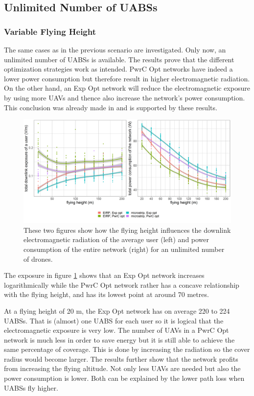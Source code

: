 \documentclass[twocolumn]{phdsymp} %
\begin{document}
\subsection{Unlimited Number of UABSs}
\subsubsection{Variable Flying Height}
The same cases as in the previous scenario are investigated. Only now, an unlimited number of \gls{UABS}s is available.
The results prove that the different optimization strategies work as intended.
\gls{PwrC Opt} networks have indeed a lower power consumption but therefore result in higher electromagnetic radiation.
On the other hand, an \gls{Exp Opt} network will reduce the electromagnetic exposure by using more \gls{UAV}s and thence also increase the network's
power consumption.
This conclusion was already made in \cite{J1} and is supported by these results.
\begin{figure}[h!]
  \includegraphics[width=\linewidth]{../results/s3/fhvsdlAndPc.png}
  \caption{These two figures show how the flying height influences the downlink electromagnetic radiation of the average user (left) and 
  power consumption of the entire network (right) for an unlimited number of drones.}
  \label{fig:s3a_dlAndPc}
\end{figure}

The exposure in figure \ref{fig:s3a_dlAndPc} shows that an \gls{Exp Opt} network increases logarithmically while the \gls{PwrC Opt} network rather 
has a concave relationship with the flying height, and has its lowest point at around 70 metres.

At a flying height of 20 m, the \gls{Exp Opt} network has on average 220 to 224 \gls{UABS}s. That is (almost) one \gls{UABS} for each user
so it is logical that the electromagnetic exposure is very low.
The number of \gls{UAV}s in a \gls{PwrC Opt} network is much less in order 
to save energy but it is still able to achieve the same percentage of coverage.
This is done by increasing the radiation so the cover radius would become larger.
The results further show that the network profits from increasing the flying altitude. Not only
less \gls{UAV}s are needed but also the power consumption is lower. Both can be explained by the
lower path loss when UABSs fly higher. 
\end{document}
